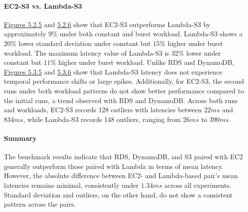\paragraph*{EC2-S3 vs. Lambda-S3}
\hyperref[fig:bar_s3_const]{Figures 5.2.5} and \hyperref[fig:bar_s3_bursty]{5.2.6} show that EC2-S3 outperforms Lambda-S3 by approximately $9\%$ under both constant and burst workload. Lambda-S3 shows a $20\%$ lower standard deviation under constant but $15\%$ higher under burst workload. The maximum latency value of Lambda-S3 is $32\%$ lower under constant but $11\%$ higher under burst workload.
%
Unlike RDS and DynamoDB, \hyperref[fig:ts_s3_const]{Figures 5.3.5} and \hyperref[fig:ts_s3_bursty]{5.3.6} show that Lambda-S3 latency does not experience temporal performance shifts or large spikes. Additionally, for EC2-S3, the second runs under both workload patterns do not show better performance compared to the initial runs, a trend observed with RDS and DynamoDB.
%
Across both runs and workloads, EC2-S3 records 128 outliers with latencies between $22ms$ and $834ms$, while Lambda-S3 records 148 outliers, ranging from $26ms$ to $390ms$.

\paragraph*{Summary}
The benchmark results indicate that RDS, DynamoDB, and S3 paired with EC2 generally outperform those paired with Lambda in terms of mean latency. However, the absolute difference between EC2- and Lambda-based pair's mean latencies remains minimal, consistently under $1.34ms$ across all experiments. Standard deviation and outliers, on the other hand, do not show a consistent pattern across the pairs. 

